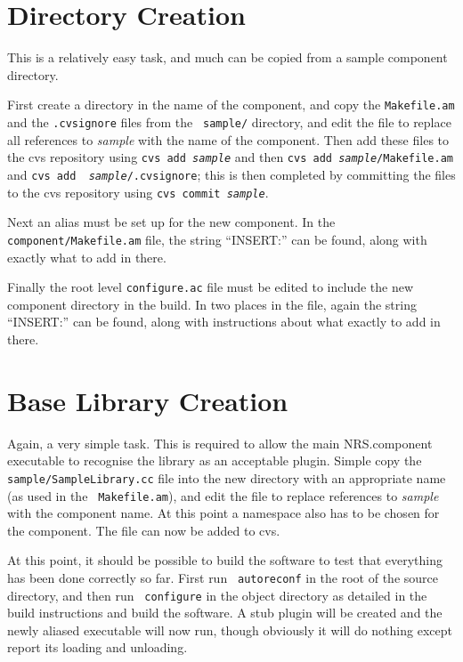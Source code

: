 \documentclass[pdftex,a4paper]{article}
\begin{document}
\section{Directory Creation}

This is a relatively easy task, and much can be copied from a sample
component directory.

First create a directory in the name of the component, and copy the
{\tt Makefile.am} and the {\tt .cvsignore} files from the {\tt
sample/} directory, and edit the file to replace all references to
{\em sample} with the name of the component. Then add these files to
the cvs repository using {\tt cvs add {\em sample}} and then {\tt cvs
add {\em sample}/Makefile.am} and {\tt cvs add {\em
sample}/.cvsignore}; this is then completed by committing the files to
the cvs repository using {\tt cvs commit {\em sample}}.

Next an alias must be set up for the new component. In the {\tt
component/Makefile.am} file, the string ``INSERT:'' can be found,
along with exactly what to add in there.

Finally the root level {\tt configure.ac} file must be edited to
include the new component directory in the build. In two places in the
file, again the string ``INSERT:'' can be found, along with
instructions about what exactly to add in there.

\section{Base Library Creation}

Again, a very simple task. This is required to allow the main
NRS.component executable to recognise the library as an acceptable
plugin. Simple copy the {\tt sample/SampleLibrary.cc} file into the
new directory with an appropriate name (as used in the {\tt
Makefile.am}), and edit the file to replace references to {\em sample}
with the component name. At this point a namespace also has to be
chosen for the component. The file can now be added to cvs.

At this point, it should be possible to build the software to test
that everything has been done correctly so far. First run {\tt
autoreconf} in the root of the source directory, and then run {\tt
configure} in the object directory as detailed in the build
instructions and build the software. A stub plugin will be created and
the newly aliased executable will now run, though obviously it will do
nothing except report its loading and unloading.
\end{document}
